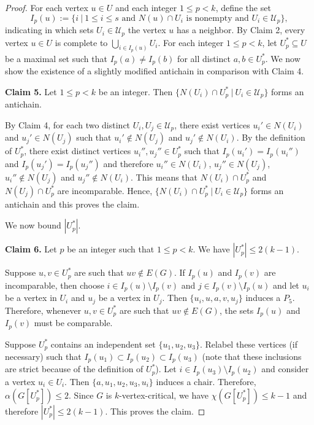 \documentclass[10pt]{article}
\theoremstyle{definition}
\begin{document}
\begin{proof}
\noindent

For each vertex $u \in U$ and each integer $1 \leq p<k$, define the set 
$$I_p(u) := \{i~|~1 \leq i \leq s\text{ and }N(u) \cap U_i\text{ is nonempty and }U_i \in \mathcal{U}_p\},$$ 
indicating in which sets $U_i \in \mathcal{U}_p$ the vertex $u$ has a neighbor. By Claim 2, every vertex $u \in U$ is complete to $\bigcup_{i \in I_p(u)}U_i$. For each integer $1 \leq p<k$, let $U_p^* \subseteq U$ be a maximal set such that $I_p(a) \neq I_p(b)$ for all distinct $a, b \in U_p^*$. We now show the existence of a slightly modified antichain in comparison with Claim 4.

\noindent \textbf{Claim 5.} Let $1 \leq p <k$ be an integer. Then $\{N(U_i) \cap U_p^*~|~U_i \in \mathcal{U}_p\}$ forms an antichain.

\bigskip

By Claim 4, for each two distinct $U_i, U_j \in \mathcal{U}_p$, there exist vertices $u_i' \in N(U_i)$ and $u_j' \in N(U_j)$ such that $u_i' \notin N(U_j)$ and $u_j' \notin N(U_i)$. By the definition of $U_p^*$, there exist distinct vertices $u_i'' ,u_j''\in U_p^*$ such that $I_p(u_i')=I_p(u_i'')$ and  $I_p(u_j')=I_p(u_j'')$ and therefore $u_i'' \in N(U_i)$, $u_j'' \in N(U_j)$, $u_i'' \notin N(U_j)$ and $u_j'' \notin N(U_i)$. This means that $N(U_i) \cap U_p^*$ and $N(U_j) \cap U_p^*$ are incomparable. Hence, $\{N(U_i) \cap U_p^*~|~U_i \in \mathcal{U}_p\}$ forms an antichain and this proves the claim.
\bigskip

\noindent

We now bound $|U_p^*|$.

\noindent \textbf{Claim 6.} Let $p$ be an integer such that $1 \leq p <k$. We have $|U_p^*| \leq 2(k-1)$.

\bigskip

Suppose $u, v \in U_p^*$ are such that $uv \notin E(G)$. If $I_p(u)$ and $I_p(v)$ are incomparable, then choose $i \in I_p(u) \setminus I_p(v)$ and $j \in I_p(v) \setminus I_p(u)$ and let $u_i$ be a vertex in $U_i$ and $u_j$ be a vertex in $U_j$. Then $\{u_i,u,a,v,u_j\}$ induces a $P_5$. Therefore, whenever $u, v \in U_p^*$ are such that $uv \notin E(G)$, the sets $I_p(u)$ and $I_p(v)$ must be comparable.

Suppose $U_p^*$ contains an independent set $\{u_1,u_2,u_3\}$. Relabel these vertices (if necessary) such that $I_p(u_1) \subset I_p(u_2) \subset I_p(u_3)$ (note that these inclusions are strict because of the definition of $U_p^*$). Let $i \in I_p(u_3) \setminus I_p(u_2)$ and consider a vertex $u_i \in U_i$. Then $\{a,u_1,u_2,u_3,u_i\}$ induces a $\text{chair}$. Therefore, $\alpha(G[U_p^*]) \leq 2$. Since $G$ is $k$-vertex-critical, we have $\chi(G[U_p^*]) \leq k-1$ and therefore $|U_p^*| \leq 2(k-1)$. This proves the claim.


\end{proof}
\end{document}
